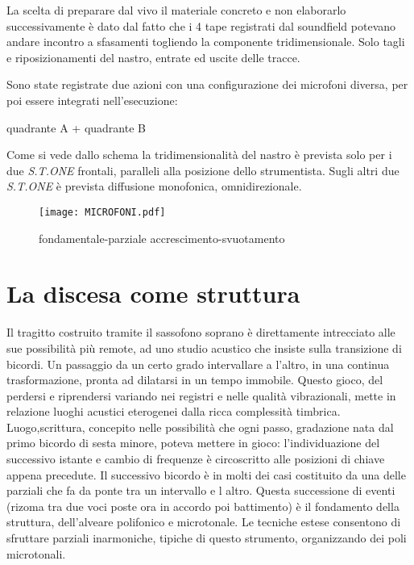 La scelta di preparare  dal vivo il materiale  concreto e non elaborarlo successivamente
è dato dal fatto che i 4 tape registrati dal soundfield potevano andare incontro a
sfasamenti togliendo la componente tridimensionale. Solo tagli e riposizionamenti
del nastro, entrate ed uscite delle tracce.

Sono state registrate due azioni con una configurazione dei microfoni diversa,
per poi essere integrati nell'esecuzione:

\begin{center}
quadrante A + quadrante B
\end{center} 

Come si vede dallo schema la tridimensionalità del nastro è prevista solo per i due
\emph{S.T.ONE} frontali, paralleli alla posizione dello strumentista. Sugli altri due
\emph{S.T.ONE} è prevista diffusione monofonica, omnidirezionale.

\begin{figure}[h]
\centering
{\texttt{[image: MICROFONI.pdf]}}
\caption[Passaggio microtonale]{fondamentale-parziale accrescimento-svuotamento}
\label{fig:microtoni}
\end{figure}

\section{La discesa come struttura}

Il tragitto costruito tramite il sassofono soprano è direttamente intrecciato alle sue
possibilità più remote, ad uno studio acustico che insiste sulla transizione di bicordi.
Un passaggio da un certo grado intervallare a l’altro, in una continua trasformazione,
pronta ad dilatarsi in un tempo immobile. Questo gioco, del perdersi e riprendersi
variando nei registri e nelle  qualità vibrazionali, mette in relazione luoghi
acustici eterogenei dalla ricca complessità timbrica.
Luogo,scrittura, concepito nelle possibilità che ogni passo, gradazione nata dal
primo bicordo di sesta minore, poteva mettere in gioco: l’individuazione del successivo
istante e cambio di frequenze è circoscritto alle posizioni di chiave appena precedute.
Il successivo bicordo è in molti dei casi costituito da una delle parziali che fa da
ponte tra un intervallo e l altro.
Questa successione di eventi (rizoma tra due voci poste ora in accordo poi battimento)
è il fondamento della struttura, dell’alveare polifonico e microtonale.
Le tecniche estese consentono di sfruttare parziali inarmoniche, tipiche di questo
strumento, organizzando dei poli microtonali.

